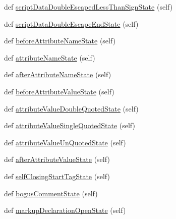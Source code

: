 \begin{DoxyCompactItemize}
\item 
def \hyperlink{classpip_1_1__vendor_1_1html5lib_1_1__tokenizer_1_1HTMLTokenizer_ac624f50fbb377df7e5bf2c5fabffd042}{script\+Data\+Double\+Escaped\+Less\+Than\+Sign\+State} (self)
\item 
def \hyperlink{classpip_1_1__vendor_1_1html5lib_1_1__tokenizer_1_1HTMLTokenizer_a2b36e19379c8a8e8834df7881e23f350}{script\+Data\+Double\+Escape\+End\+State} (self)
\item 
def \hyperlink{classpip_1_1__vendor_1_1html5lib_1_1__tokenizer_1_1HTMLTokenizer_a75947dab8d198648f83f047b7bb33474}{before\+Attribute\+Name\+State} (self)
\item 
def \hyperlink{classpip_1_1__vendor_1_1html5lib_1_1__tokenizer_1_1HTMLTokenizer_a721955f1490609f2397578f37ade5b98}{attribute\+Name\+State} (self)
\item 
def \hyperlink{classpip_1_1__vendor_1_1html5lib_1_1__tokenizer_1_1HTMLTokenizer_ab7a81e41688058d7442ab32f6d90405c}{after\+Attribute\+Name\+State} (self)
\item 
def \hyperlink{classpip_1_1__vendor_1_1html5lib_1_1__tokenizer_1_1HTMLTokenizer_a0afdc918edc55b9af9f1746ca7e13dd5}{before\+Attribute\+Value\+State} (self)
\item 
def \hyperlink{classpip_1_1__vendor_1_1html5lib_1_1__tokenizer_1_1HTMLTokenizer_aada4bae10c7bd0910b75c9356ecb27bf}{attribute\+Value\+Double\+Quoted\+State} (self)
\item 
def \hyperlink{classpip_1_1__vendor_1_1html5lib_1_1__tokenizer_1_1HTMLTokenizer_a15a7dc634202c1a345875e08fdb46b5b}{attribute\+Value\+Single\+Quoted\+State} (self)
\item 
def \hyperlink{classpip_1_1__vendor_1_1html5lib_1_1__tokenizer_1_1HTMLTokenizer_ade3e299a92cfe35edd4d8bd017e9ca98}{attribute\+Value\+Un\+Quoted\+State} (self)
\item 
def \hyperlink{classpip_1_1__vendor_1_1html5lib_1_1__tokenizer_1_1HTMLTokenizer_a40513b48271e23c6aa6b59bc7d0e2156}{after\+Attribute\+Value\+State} (self)
\item 
def \hyperlink{classpip_1_1__vendor_1_1html5lib_1_1__tokenizer_1_1HTMLTokenizer_a580af8a1781ce38d388b405d56db940e}{self\+Closing\+Start\+Tag\+State} (self)
\item 
def \hyperlink{classpip_1_1__vendor_1_1html5lib_1_1__tokenizer_1_1HTMLTokenizer_ac0aa9cf3f362e8f08ff778f78e5f9dc9}{bogus\+Comment\+State} (self)
\item 
def \hyperlink{classpip_1_1__vendor_1_1html5lib_1_1__tokenizer_1_1HTMLTokenizer_a778d110b87f171b2075034f01d235e2b}{markup\+Declaration\+Open\+State} (self)

\end{DoxyCompactItemize}

